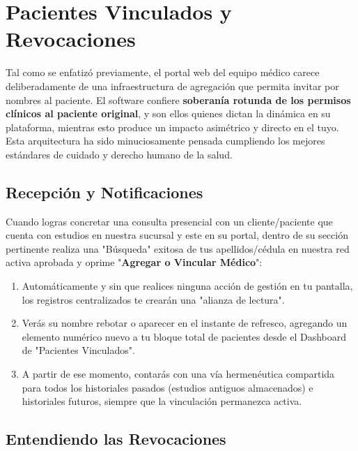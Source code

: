 \section{Pacientes Vinculados y Revocaciones}

Tal como se enfatizó previamente, el portal web del equipo médico carece deliberadamente de una infraestructura de agregación que permita invitar por nombres al paciente. El software confiere \textbf{soberanía rotunda de los permisos clínicos al paciente original}, y son ellos quienes dictan la dinámica en su plataforma, mientras esto produce un impacto asimétrico y directo en el tuyo.
Esta arquitectura ha sido minuciosamente pensada cumpliendo los mejores estándares de cuidado y derecho humano de la salud.

\subsection{Recepción y Notificaciones}

Cuando logras concretar una consulta presencial con un cliente/paciente que cuenta con estudios en nuestra sucursal y este en su portal, dentro de su sección pertinente realiza una "Búsqueda" exitosa de tus apellidos/cédula en nuestra red activa aprobada y oprime "\textbf{Agregar o Vincular Médico}":
\begin{enumerate}
    \item Automáticamente y sin que realices ninguna acción de gestión en tu pantalla, los registros centralizados te crearán una "alianza de lectura".
    \item Verás su nombre rebotar o aparecer en el instante de refresco, agregando un elemento numérico nuevo a tu bloque total de pacientes desde el Dashboard de "Pacientes Vinculados".
    \item A partir de ese momento, contarás con una vía hermenéutica compartida para todos los historiales pasados (estudios antiguos almacenados) e historiales futuros, siempre que la vinculación permanezca activa.
\end{enumerate}

\subsection{Entendiendo las Revocaciones}

